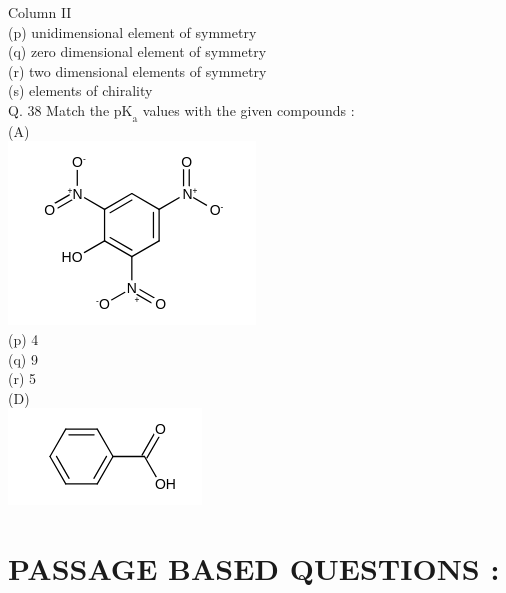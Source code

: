 \documentclass[10pt]{article}
\begin{document}
Column II\\
(p) unidimensional element of symmetry\\
(q) zero dimensional element of symmetry\\
(r) two dimensional elements of symmetry\\
(s) elements of chirality\\
Q. 38 Match the $\mathrm{pK}_{\mathrm{a}}$ values with the given compounds :\\
(A)\\
\includegraphics{smile-95903fe85d0cd9f5a7380bd6810c94e36441a3cf}\\
(p) 4\\
(q) 9\\
(r) 5\\
(D)\\
\includegraphics{smile-e4613652225208eaca37e221abca0cf813bde05b}

\section*{PASSAGE BASED QUESTIONS :}
\end{document}

